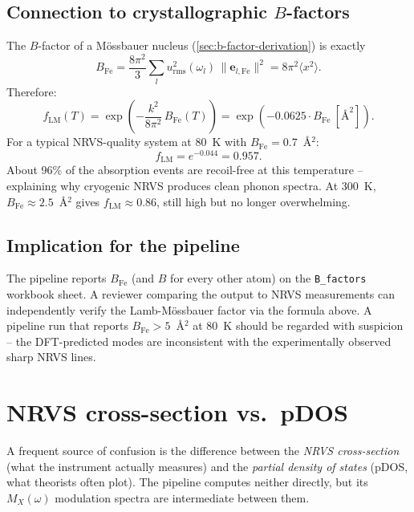 \documentclass[10pt,a4paper,twoside]{article}
\newcommand{\evec}{\mathbf{e}}
\newcommand{\urms}{u_{\mathrm{rms}}}
\begin{document}
\subsection{Connection to crystallographic $B$-factors}

The $B$-factor of a Mössbauer nucleus (\cref{sec:b-factor-derivation})
is exactly
\begin{equation}
  B_\text{Fe} = \frac{8\pi^2}{3}
                \sum_l \urms^2(\omega_l)\,
                \lVert\evec_{l,\text{Fe}}\rVert^2
              = 8\pi^2 \langle x^2 \rangle.
\end{equation}
Therefore:
\begin{equation}
  f_\text{LM}(T) = \exp\!\left(-\frac{k^2}{8\pi^2}\,B_\text{Fe}(T)\right)
                 = \exp(-0.0625 \cdot B_\text{Fe}~[\text{\AA}^2]).
\end{equation}
For a typical NRVS-quality system at 80~K with
$B_\text{Fe} = 0.7$~\AA{}$^2$:
\[
  f_\text{LM} = e^{-0.044} = 0.957.
\]
About 96\% of the absorption events are recoil-free at this
temperature -- explaining why cryogenic NRVS produces clean
phonon spectra. At 300~K, $B_\text{Fe} \approx 2.5$~\AA{}$^2$
gives $f_\text{LM} \approx 0.86$, still high but no longer
overwhelming.

\subsection{Implication for the pipeline}

The pipeline reports $B_\text{Fe}$ (and $B$ for every other atom)
on the \texttt{B\_factors} workbook sheet. A reviewer comparing
the output to NRVS measurements can independently verify the
Lamb-Mössbauer factor via the formula above. A pipeline run that
reports $B_\text{Fe} > 5$~\AA{}$^2$ at 80~K should be regarded
with suspicion -- the DFT-predicted modes are inconsistent with
the experimentally observed sharp NRVS lines.

\section{NRVS cross-section vs.\ pDOS}
\label{sec:nrvs-cross-section}

A frequent source of confusion is the difference between the
\emph{NRVS cross-section} (what the instrument actually measures)
and the \emph{partial density of states} (pDOS, what theorists
often plot). The pipeline computes neither directly, but its
$M_X(\omega)$ modulation spectra are intermediate between them.
\end{document}
